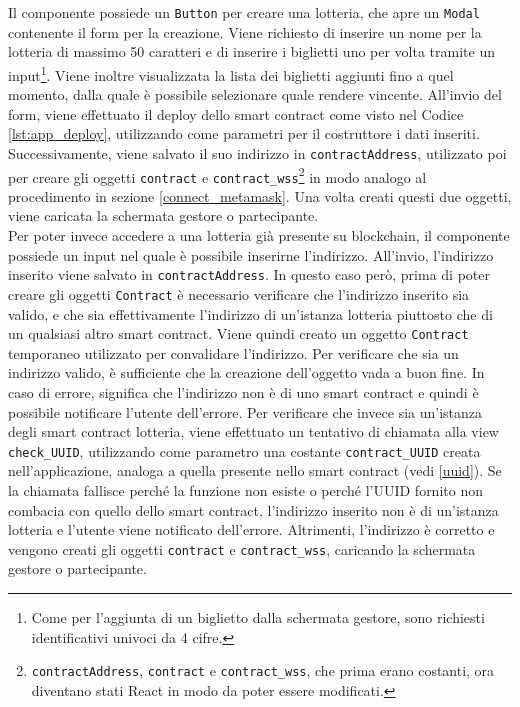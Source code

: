 \documentclass[12pt,a4paper,openright,twoside]{report}
\begin{document}
Il componente possiede un \texttt{Button} per creare una lotteria, che apre un \texttt{Modal} contenente il form per la creazione. Viene richiesto di inserire un nome per la lotteria di massimo 50 caratteri e di inserire i biglietti uno per volta tramite un input\footnote{Come per l'aggiunta di un biglietto dalla schermata gestore, sono richiesti identificativi univoci da 4 cifre.}. Viene inoltre visualizzata la lista dei biglietti aggiunti fino a quel momento, dalla quale è possibile selezionare quale rendere vincente. All'invio del form, viene effettuato il deploy dello smart contract come visto nel Codice \ref{lst:app_deploy}, utilizzando come parametri per il costruttore i dati inseriti. Successivamente, viene salvato il suo indirizzo in \texttt{contractAddress}, utilizzato poi per creare gli oggetti \texttt{contract} e \texttt{contract\_wss}\footnote{\texttt{contractAddress}, \texttt{contract} e \texttt{contract\_wss}, che prima erano costanti, ora diventano stati React in modo da poter essere modificati.} in modo analogo al procedimento in sezione \ref{connect_metamask}. Una volta creati questi due oggetti, viene caricata la schermata gestore o partecipante.\\
Per poter invece accedere a una lotteria già presente su blockchain, il componente possiede un input nel quale è possibile inserirne l'indirizzo. All'invio, l'indirizzo inserito viene salvato in \texttt{contractAddress}. In questo caso però, prima di poter creare gli oggetti \texttt{Contract} è necessario verificare che l'indirizzo inserito sia valido, e che sia effettivamente l'indirizzo di un'istanza lotteria piuttosto che di un qualsiasi altro smart contract. Viene quindi creato un oggetto \texttt{Contract} temporaneo utilizzato per convalidare l'indirizzo. Per verificare che sia un indirizzo valido, è sufficiente che la creazione dell'oggetto vada a buon fine. In caso di errore, significa che l'indirizzo non è di uno smart contract e quindi è possibile notificare l'utente dell'errore. Per verificare che invece sia un'istanza degli smart contract lotteria, viene effettuato un tentativo di chiamata alla view \texttt{check\_UUID}, utilizzando come parametro una costante \texttt{contract\_UUID} creata nell'applicazione, analoga a quella presente nello smart contract (vedi \ref{uuid}). Se la chiamata fallisce perché la funzione non esiste o perché l'UUID fornito non combacia con quello dello smart contract, l'indirizzo inserito non è di un'istanza lotteria e l'utente viene notificato dell'errore. Altrimenti, l'indirizzo è corretto e vengono creati gli oggetti \texttt{contract} e \texttt{contract\_wss}, caricando la schermata gestore o partecipante.\\
\end{document}
